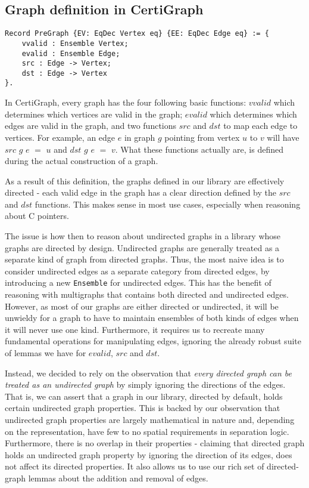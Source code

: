 \subsection{Graph definition in CertiGraph}

\begin{lstlisting}
Record PreGraph {EV: EqDec Vertex eq} {EE: EqDec Edge eq} := {
	vvalid : Ensemble Vertex;
	evalid : Ensemble Edge;
	src : Edge -> Vertex;
	dst : Edge -> Vertex
}.
\end{lstlisting}
In CertiGraph, every graph has the four following basic functions: $vvalid$ which determines which vertices are valid in the graph; $evalid$ which determines which edges are valid in the graph, and two functions $src$ and $dst$ to map each edge to vertices. For example, an edge $e$ in graph $g$ pointing from vertex $u$ to $v$ will have $src$ $g$ $e$ $=$ $u$ and $dst$ $g$ $e$ $=$ $v$. What these functions actually are, is defined during the actual construction of a graph.

As a result of this definition, the graphs defined in our library are effectively directed - each valid edge in the graph has a clear direction defined by the $src$ and $dst$ functions. This makes sense in most use cases, especially when reasoning about C pointers.

The issue is how then to reason about undirected graphs in a library whose graphs are directed by design. Undirected graphs are generally treated as a separate kind of graph from directed graphs. Thus, the most naive idea is to consider undirected edges as a separate category from directed edges, by introducing a new \texttt{Ensemble} for undirected edges. This has the benefit of reasoning with multigraphs that contains both directed and undirected edges. However, as most of our graphs are either directed or undirected, it will be unwieldy for a graph to have to maintain ensembles of both kinds of edges when it will never use one kind. Furthermore, it requires us to recreate many fundamental operations for manipulating edges, ignoring the already robust suite of lemmas we have for $evalid$, $src$ and $dst$.

Instead, we decided to rely on the observation that \textit{every directed graph can be treated as an undirected graph} by simply ignoring the directions of the edges. That is, we can assert that a graph in our library, directed by default, holds certain undirected graph properties. This is backed by our observation that undirected graph properties are largely mathematical in nature and, depending on the representation, have few to no spatial requirements in separation logic. Furthermore, there is no overlap in their properties - claiming that directed graph holds an undirected graph property by ignoring the direction of its edges, does not affect its directed properties. It also allows us to use our rich set of directed-graph lemmas about the addition and removal of edges.

